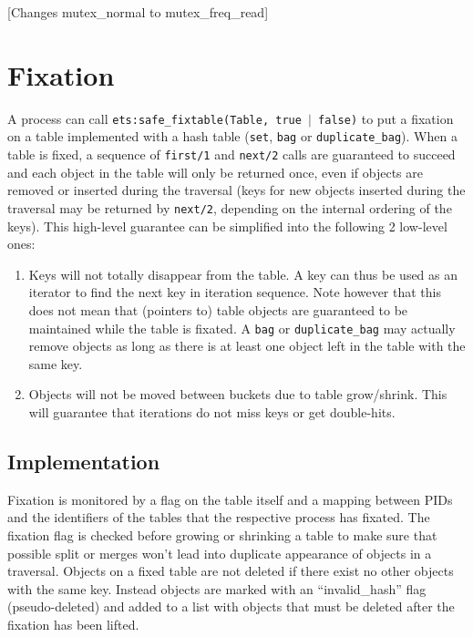 \documentclass[aps,pre,preprint,nofootinbib]{revtex4}
\begin{document}
[Changes mutex\_normal to mutex\_freq\_read]

\section{Fixation}
\label{sec:fixation}

A process can call \texttt{ets:safe\_fixtable(Table, true $|$ false)} to put a fixation on a table implemented with a hash table (\verb|set|, \verb|bag| or \verb|duplicate_bag|).
When a table is fixed, a sequence of \verb|first/1| and \verb|next/2| calls are guaranteed to succeed and each object in the table will only be returned once, even if objects are removed or inserted during the traversal (keys for new objects inserted during the traversal may be returned by \verb|next/2|, depending on the internal ordering of the keys).
This high-level guarantee can be simplified into the following 2 low-level ones:

\begin{enumerate}
  \item Keys will not totally disappear from the table.
    A key can thus be used as an iterator to find the next key in iteration sequence.
    Note however that this does not mean that (pointers to) table objects are guaranteed to be maintained while the table is fixated.
    A \verb|bag| or \verb|duplicate_bag| may actually remove objects as long as there is at least one object left in the table with the same key.
    \item Objects will not be moved between buckets due to table grow/shrink.
      This will guarantee that iterations do not miss keys or get double-hits.
\end{enumerate}

\subsection{Implementation}

Fixation is monitored by a flag on the table itself and a mapping between PIDs and the identifiers of the tables that the respective process has fixated.
The fixation flag is checked before growing or shrinking a table to make sure that possible split or merges won't lead into duplicate appearance of objects in a traversal.
Objects on a fixed table are not deleted if there exist no other objects with the same key.
Instead objects are marked with an ``invalid\_hash'' flag (pseudo-deleted) and added to a list with objects that must be deleted after the fixation has been lifted.
\end{document}
